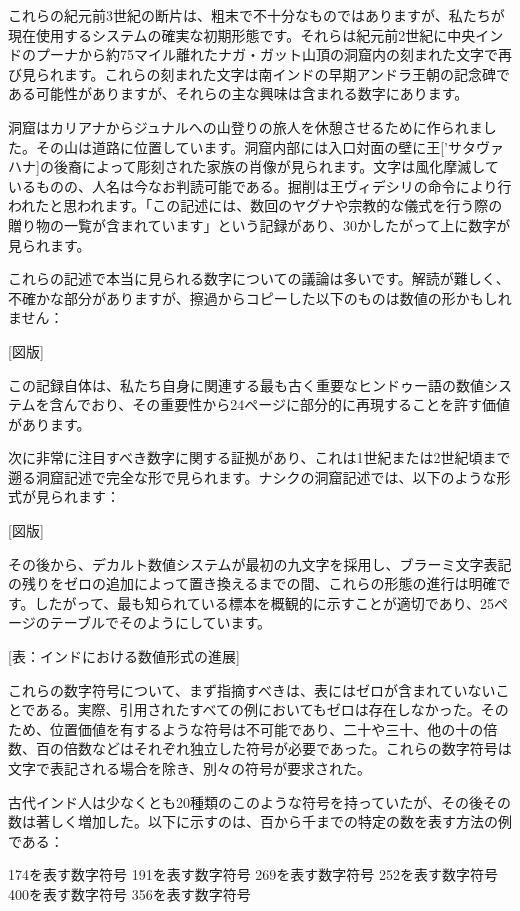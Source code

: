\documentclass[a4paper,11pt,openany]{ltjsbook}
\begin{document}
これらの紀元前3世紀の断片は、粗末で不十分なものではありますが、私たちが現在使用するシステムの確実な初期形態です。それらは紀元前2世紀に中央インドのプーナから約75マイル離れたナガ・ガット山頂の洞窟内の刻まれた文字で再び見られます。これらの刻まれた文字は南インドの早期アンドラ王朝の記念碑である可能性がありますが、それらの主な興味は含まれる数字にあります。

洞窟はカリアナからジュナルへの山登りの旅人を休憩させるために作られました。その山は道路に位置しています。洞窟内部には入口対面の壁に王['サタヴァハナ]の後裔によって彫刻された家族の肖像が見られます。文字は風化摩滅しているものの、人名は今なお判読可能である。掘削は王ヴィデシリの命令により行われたと思われます。「この記述には、数回のヤグナや宗教的な儀式を行う際の贈り物の一覧が含まれています」という記録があり、30かしたがって上に数字が見られます。

これらの記述で本当に見られる数字についての議論は多いです。解読が難しく、不確かな部分がありますが、擦過からコピーした以下のものは数値の形かもしれません：

[図版]

この記録自体は、私たち自身に関連する最も古く重要なヒンドゥー語の数値システムを含んでおり、その重要性から24ページに部分的に再現することを許す価値があります。

次に非常に注目すべき数字に関する証拠があり、これは1世紀または2世紀頃まで遡る洞窟記述で完全な形で見られます。ナシクの洞窟記述では、以下のような形式が見られます：

[図版]

その後から、デカルト数値システムが最初の九文字を採用し、ブラーミ文字表記の残りをゼロの追加によって置き換えるまでの間、これらの形態の進行は明確です。したがって、最も知られている標本を概観的に示すことが適切であり、25ページのテーブルでそのようにしています。

[表：インドにおける数値形式の進展]

これらの数字符号について、まず指摘すべきは、表にはゼロが含まれていないことである。実際、引用されたすべての例においてもゼロは存在しなかった。そのため、位置価値を有するような符号は不可能であり、二十や三十、他の十の倍数、百の倍数などはそれぞれ独立した符号が必要であった。これらの数字符号は文字で表記される場合を除き、別々の符号が要求された。

古代インド人は少なくとも20種類のこのような符号を持っていたが、その後その数は著しく増加した。以下に示すのは、百から千までの特定の数を表す方法の例である：

174を表す数字符号
191を表す数字符号
269を表す数字符号
252を表す数字符号
400を表す数字符号
356を表す数字符号
\end{document}
